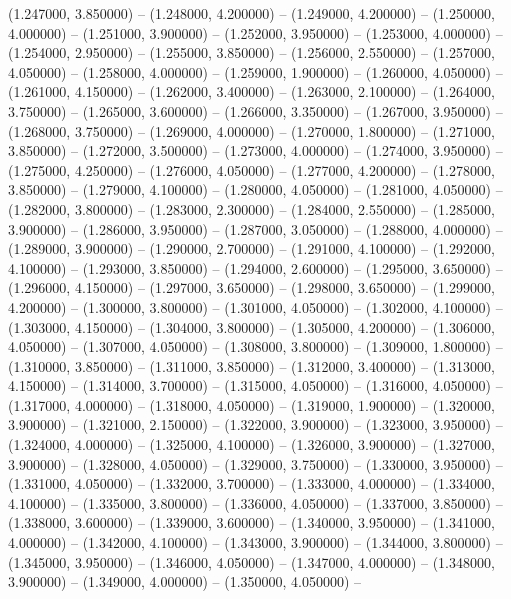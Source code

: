 (1.247000, 3.850000) -- 
(1.248000, 4.200000) -- 
(1.249000, 4.200000) -- 
(1.250000, 4.000000) -- 
(1.251000, 3.900000) -- 
(1.252000, 3.950000) -- 
(1.253000, 4.000000) -- 
(1.254000, 2.950000) -- 
(1.255000, 3.850000) -- 
(1.256000, 2.550000) -- 
(1.257000, 4.050000) -- 
(1.258000, 4.000000) -- 
(1.259000, 1.900000) -- 
(1.260000, 4.050000) -- 
(1.261000, 4.150000) -- 
(1.262000, 3.400000) -- 
(1.263000, 2.100000) -- 
(1.264000, 3.750000) -- 
(1.265000, 3.600000) -- 
(1.266000, 3.350000) -- 
(1.267000, 3.950000) -- 
(1.268000, 3.750000) -- 
(1.269000, 4.000000) -- 
(1.270000, 1.800000) -- 
(1.271000, 3.850000) -- 
(1.272000, 3.500000) -- 
(1.273000, 4.000000) -- 
(1.274000, 3.950000) -- 
(1.275000, 4.250000) -- 
(1.276000, 4.050000) -- 
(1.277000, 4.200000) -- 
(1.278000, 3.850000) -- 
(1.279000, 4.100000) -- 
(1.280000, 4.050000) -- 
(1.281000, 4.050000) -- 
(1.282000, 3.800000) -- 
(1.283000, 2.300000) -- 
(1.284000, 2.550000) -- 
(1.285000, 3.900000) -- 
(1.286000, 3.950000) -- 
(1.287000, 3.050000) -- 
(1.288000, 4.000000) -- 
(1.289000, 3.900000) -- 
(1.290000, 2.700000) -- 
(1.291000, 4.100000) -- 
(1.292000, 4.100000) -- 
(1.293000, 3.850000) -- 
(1.294000, 2.600000) -- 
(1.295000, 3.650000) -- 
(1.296000, 4.150000) -- 
(1.297000, 3.650000) -- 
(1.298000, 3.650000) -- 
(1.299000, 4.200000) -- 
(1.300000, 3.800000) -- 
(1.301000, 4.050000) -- 
(1.302000, 4.100000) -- 
(1.303000, 4.150000) -- 
(1.304000, 3.800000) -- 
(1.305000, 4.200000) -- 
(1.306000, 4.050000) -- 
(1.307000, 4.050000) -- 
(1.308000, 3.800000) -- 
(1.309000, 1.800000) -- 
(1.310000, 3.850000) -- 
(1.311000, 3.850000) -- 
(1.312000, 3.400000) -- 
(1.313000, 4.150000) -- 
(1.314000, 3.700000) -- 
(1.315000, 4.050000) -- 
(1.316000, 4.050000) -- 
(1.317000, 4.000000) -- 
(1.318000, 4.050000) -- 
(1.319000, 1.900000) -- 
(1.320000, 3.900000) -- 
(1.321000, 2.150000) -- 
(1.322000, 3.900000) -- 
(1.323000, 3.950000) -- 
(1.324000, 4.000000) -- 
(1.325000, 4.100000) -- 
(1.326000, 3.900000) -- 
(1.327000, 3.900000) -- 
(1.328000, 4.050000) -- 
(1.329000, 3.750000) -- 
(1.330000, 3.950000) -- 
(1.331000, 4.050000) -- 
(1.332000, 3.700000) -- 
(1.333000, 4.000000) -- 
(1.334000, 4.100000) -- 
(1.335000, 3.800000) -- 
(1.336000, 4.050000) -- 
(1.337000, 3.850000) -- 
(1.338000, 3.600000) -- 
(1.339000, 3.600000) -- 
(1.340000, 3.950000) -- 
(1.341000, 4.000000) -- 
(1.342000, 4.100000) -- 
(1.343000, 3.900000) -- 
(1.344000, 3.800000) -- 
(1.345000, 3.950000) -- 
(1.346000, 4.050000) -- 
(1.347000, 4.000000) -- 
(1.348000, 3.900000) -- 
(1.349000, 4.000000) -- 
(1.350000, 4.050000) -- 
